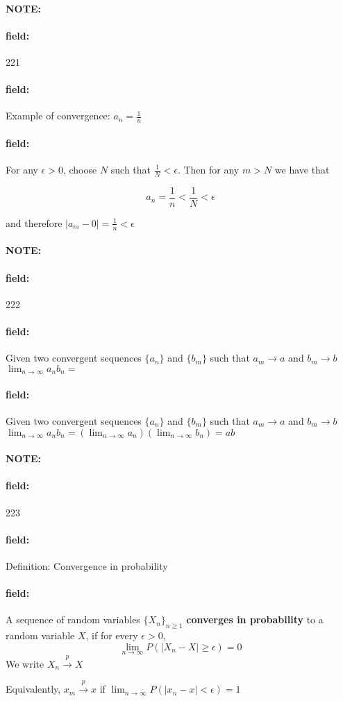 \documentclass[12pt]{article}
\newenvironment{note}{\paragraph{NOTE:}}{}
\newenvironment{field}{\paragraph{field:}}{}
\begin{document}
\begin{note} \begin{field} \tiny 221 \end{field}
  \begin{field}
    Example of convergence: $a_n = \frac{1}{n}$
  \end{field}
  \begin{field}
    For any $\epsilon > 0$, choose $N$ such that $\frac{1}{N} < \epsilon$. Then for any $m > N$ we have that

    $$a_n = \frac{1}{n} < \frac{1}{N} < \epsilon$$

    and therefore $|a_m - 0| = \frac{1}{n} < \epsilon$
  \end{field}
\end{note}


\begin{note} \begin{field} \tiny 222 \end{field}
  \begin{field}
    Given two convergent sequences $\{a_n\}$ and $\{b_m\}$ such that $a_m \to a$ and $b_m \to b$\\
    $\lim_{n \to \infty} a_nb_n = $
  \end{field}
  \begin{field}
    Given two convergent sequences $\{a_n\}$ and $\{b_m\}$ such that $a_m \to a$ and $b_m \to b$\\
    $\lim_{n \to \infty} a_nb_n = (\lim_{n \to \infty}a_n)(\lim_{n \to \infty}b_n) = ab$
  \end{field}
\end{note}


\begin{note} \begin{field} \tiny 223 \end{field}
  \begin{field}
    Definition: Convergence in probability
  \end{field}
  \begin{field}
    A sequence of random variables $\{X_n\}_{n \geq 1}$ \textbf{converges in probability } to a random variable $X$, if for every $\epsilon > 0$, $$\lim_{n \to \infty}P(|X_n - X| \geq \epsilon) = 0 $$
    We write $X_n \overset{p}{\to} X$

    Equivalently, $x_m \overset{p}{\to} x$ if $\lim_{n \to \infty}P(|x_n - x| < \epsilon) = 1$
  \end{field}
\end{note}
\end{document}
